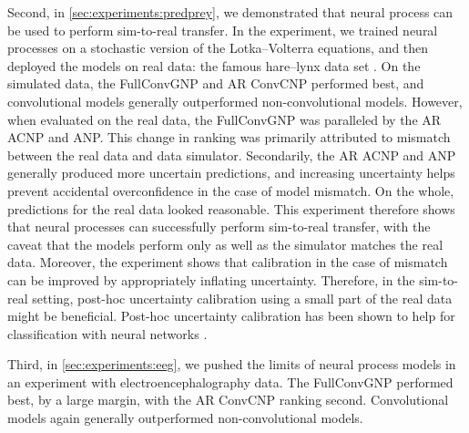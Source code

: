 \documentclass[12pt, twoside]{report}
\begin{document}
Second, in \cref{sec:experiments:predprey}, we demonstrated that neural process can be used to perform sim-to-real transfer.
In the experiment, we trained neural processes on a stochastic version of the Lotka--Volterra equations, and then deployed the models on real data: the famous hare--lynx data set \parencite{MacLulich:1937:Fluctuations_in_the_Numbers_of_the_Varying_Hare}.
On the simulated data, the FullConvGNP and AR ConvCNP performed best,
and convolutional models generally outperformed non-convolutional models.
However, when evaluated on the real data, the FullConvGNP was paralleled by the AR ACNP and ANP.
This change in ranking was primarily attributed to mismatch between the real data and data simulator.
Secondarily, the AR ACNP and ANP generally produced more uncertain predictions,
and increasing uncertainty helps prevent accidental overconfidence in the case of model mismatch.
On the whole, predictions for the real data looked reasonable.
This experiment therefore shows that neural processes can successfully perform sim-to-real transfer,
with the caveat that the models perform only as well as the simulator matches the real data.
Moreover, the experiment shows that calibration in the case of mismatch can be improved by appropriately inflating uncertainty.
Therefore, in the sim-to-real setting,
post-hoc uncertainty calibration using a small part of the real data might be beneficial.
Post-hoc uncertainty calibration has been shown to help for classification with neural networks \parencite{Guo:2017:On_Calibration_of_Modern_Neural,Tomani:2021:Post-Hoc_Uncertainty_Calibration_for_Domain}.

Third, in \cref{sec:experiments:eeg}, we pushed the limits of neural process models in an experiment with electroencephalography data.
The FullConvGNP performed best, by a large margin, with the AR ConvCNP ranking second.
Convolutional models again generally outperformed non-convolutional models.
\end{document}
